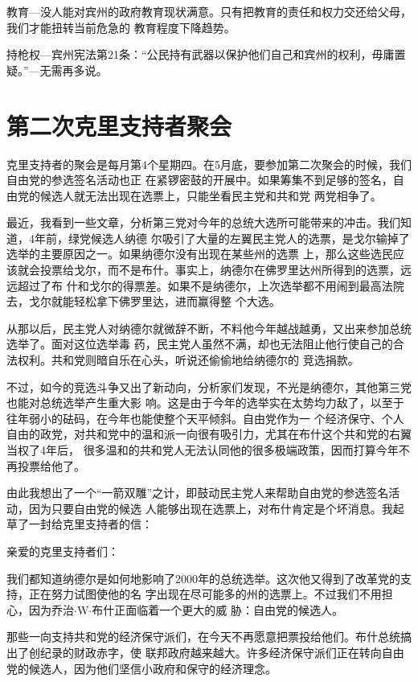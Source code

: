 ﻿\documentclass[11pt]{article}
\begin{document}
教育---没人能对宾州的政府教育现状满意。只有把教育的责任和权力交还给父母，我们才能扭转当前危急的
教育程度下降趋势。

持枪权---宾州宪法第21条：``公民持有武器以保护他们自己和宾州的权利，毋庸置疑。''---无需再多说。

\section{第二次克里支持者聚会}

克里支持者的聚会是每月第4个星期四。在5月底，要参加第二次聚会的时候，我们自由党的参选签名活动也正
在紧锣密鼓的开展中。如果筹集不到足够的签名，自由党的候选人就无法出现在选票上，只能坐看民主党和共和党
两党相争了。

最近，我看到一些文章，分析第三党对今年的总统大选所可能带来的冲击。我们知道，4年前，绿党候选人纳德
尔吸引了大量的左翼民主党人的选票，是戈尔输掉了选举的主要原因之一。如果纳德尔没有出现在某些州的选票
上，那么这些选民应该就会投票给戈尔，而不是布什。事实上，纳德尔在佛罗里达州所得到的选票，远远超过了布
什和戈尔的得票差。如果不是纳德尔，上次选举都不用闹到最高法院去，戈尔就能轻松拿下佛罗里达，进而赢得整
个大选。

从那以后，民主党人对纳德尔就微辞不断，不料他今年越战越勇，又出来参加总统选举了。面对这位选举毒
药，民主党人虽然不满，却也无法阻止他行使自己的合法权利。共和党则暗自乐在心头，听说还偷偷地给纳德尔的
竞选捐款。

不过，如今的竞选斗争又出了新动向，分析家们发现，不光是纳德尔，其他第三党也能对总统选举产生重大影
响。这是由于今年的选举实在太势均力敌了，以至于往年弱小的砝码，在今年也能使整个天平倾斜。自由党作为一
个经济保守、个人自由的政党，对共和党中的温和派一向很有吸引力，尤其在布什这个共和党的右翼当权了4年后，
很多温和的共和党人无法认同他的很多极端政策，因而打算今年不再投票给他了。

由此我想出了一个``一箭双雕''之计，即鼓动民主党人来帮助自由党的参选签名活动，因为只要自由党的候选
人能够出现在选票上，对布什肯定是个坏消息。我起草了一封给克里支持者的信：

亲爱的克里支持者们：

我们都知道纳德尔是如何地影响了2000年的总统选举。这次他又得到了改革党的支持，正在努力试图使他的名
字出现在尽可能多的州的选票上。不过我们不用担心，因为乔治$\cdot$W$\cdot$布什正面临着一个更大的威
胁：自由党的候选人。

那些一向支持共和党的经济保守派们，在今天不再愿意把票投给他们。布什总统搞出了创纪录的财政赤字，使
联邦政府越来越大。许多经济保守派们正在转向自由党的候选人，因为他们坚信小政府和保守的经济理念。
\end{document}
